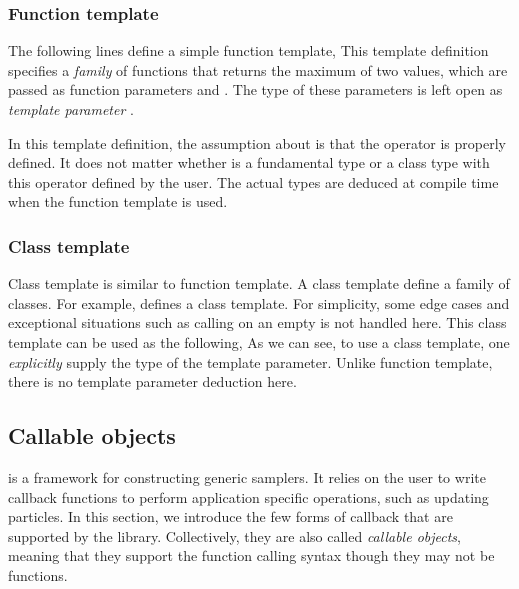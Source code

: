 \subsubsection{Function template}
\label{ssub:Function template}

The following lines define a simple function template,
This template definition specifies a \emph{family} of functions that returns
the maximum of two values, which are passed as function parameters
 and . The type of these parameters is left open as
\emph{template parameter} .

In this template definition, the assumption about  is that the
operator \cppinline{<} is properly defined. It does not matter whether
 is a fundamental type or a class type with this operator defined
by the user. The actual types are deduced at compile time when the function
template is used.

\subsubsection{Class template}
\label{ssub:Class template}

Class template is similar to function template. A class template define a
family of classes. For example,
defines a  class template. For simplicity, some edge cases
and exceptional situations such as calling  on an empty
 is not handled here. This class template can be used as the
following,
As we can see, to use a class template, one \emph{explicitly} supply the type
of the template parameter. Unlike function template, there is no template
parameter deduction here.

\subsection{Callable objects}
\label{sub:Callable objects}

\vsmc is a framework for constructing generic \smc samplers. It relies on the
user to write callback functions to perform application specific operations,
such as updating particles. In this section, we introduce the few forms of
callback that are supported by the library. Collectively, they are also called
\emph{callable objects}, meaning that they support the function calling syntax
though they may not be functions.

